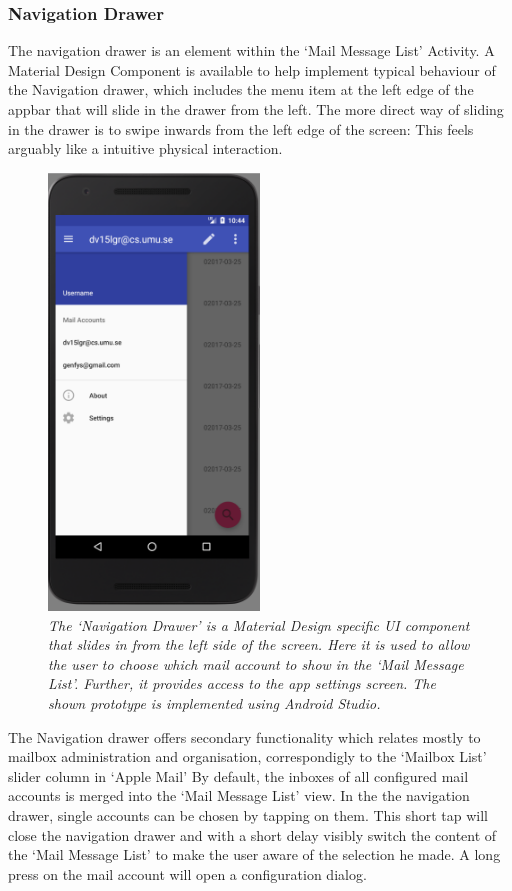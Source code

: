 \documentclass[a4paper,11pt,twoside]{article}
\begin{document}
\subsubsection{Navigation Drawer}
The navigation drawer is an element within the `Mail Message List' Activity. A
Material Design Component is available to help implement typical behaviour of
the Navigation drawer, which includes the menu item at the left edge of the appbar
that will slide in the drawer from the left. The more direct way of
sliding in the drawer is to swipe inwards from the left edge of the screen: This
feels arguably like a intuitive physical interaction.

\begin{figure}[hp!]
  \label{fig:nav_drawer}
  \centering
    \includegraphics[width=0.5\textwidth]{nav_drawer}
    \caption{\textit{The `Navigation Drawer' is a Material Design specific
    UI component that slides in from the left side of the screen. Here it
    is used to allow the user to choose which mail account to show in the
    `Mail Message List'. Further, it provides access to the app settings
    screen. The shown prototype is implemented using Android Studio.}}
\end{figure}

The Navigation drawer offers secondary functionality which relates mostly to
mailbox administration and organisation, correspondigly to the `Mailbox List'
slider column in `Apple Mail'  By default, the inboxes of
all configured mail accounts is merged into the `Mail Message List' view. In the
the navigation drawer, single accounts can be chosen by tapping on them. This
short tap will close the navigation drawer and with a short delay visibly switch
the content of the `Mail Message List' to make the user aware of the selection
he made. A long press on the mail account will open a configuration dialog.
\end{document}
